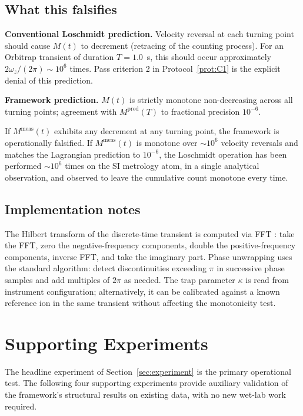 \documentclass[twocolumn,10pt,a4paper]{article}
\theoremstyle{thmstyle}
\theoremstyle{definition}
\theoremstyle{remark}
\begin{document}
\subsection{What this falsifies}

\textbf{Conventional Loschmidt prediction.} Velocity reversal at each
turning point should cause $M(t)$ to decrement (retracing of the
counting process). For an Orbitrap transient of duration
$T=1.0$~s, this should occur approximately
$2\omega_{z}/(2\pi)\sim 10^{6}$ times. Pass criterion 2 in
Protocol~\ref{prot:C1} is the explicit denial of this prediction.

\textbf{Framework prediction.} $M(t)$ is strictly monotone
non-decreasing across all turning points; agreement with
$M^{\mathrm{pred}}(T)$ to fractional precision $10^{-6}$.

If $M^{\mathrm{meas}}(t)$ exhibits any decrement at any turning point,
the framework is operationally falsified. If $M^{\mathrm{meas}}(t)$ is
monotone over $\sim 10^{6}$ velocity reversals and matches the
Lagrangian prediction to $10^{-6}$, the Loschmidt operation has been
performed $\sim 10^{6}$ times on the SI metrology atom, in a single
analytical observation, and observed to leave the cumulative count
monotone every time.

\subsection{Implementation notes}

The Hilbert transform of the discrete-time transient is computed via
FFT \citep{cooley1965}: take the FFT, zero the negative-frequency
components, double the positive-frequency components, inverse FFT,
and take the imaginary part. Phase unwrapping uses the standard
algorithm: detect discontinuities exceeding $\pi$ in successive phase
samples and add multiples of $2\pi$ as needed. The trap parameter
$\kappa$ is read from instrument configuration; alternatively, it can
be calibrated against a known reference ion in the same transient
without affecting the monotonicity test.

\section{Supporting Experiments}
\label{sec:supporting}

The headline experiment of Section~\ref{sec:experiment} is the
primary operational test. The following four supporting experiments
provide auxiliary validation of the framework's structural results on
existing data, with no new wet-lab work required.
\end{document}
